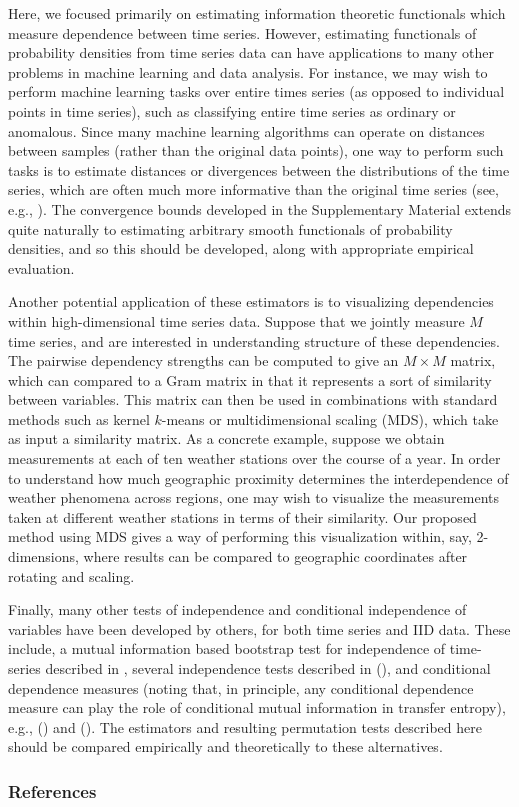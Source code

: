 \documentclass{article} %
\begin{document}
Here, we focused primarily on estimating information theoretic functionals
which measure dependence between time series. However, estimating functionals
of probability densities from time series data can have applications to many
other problems in machine learning and data analysis. For instance, we may wish
to perform machine learning tasks over entire times series (as opposed to
individual points in time series), such as classifying entire time series as
ordinary or anomalous. Since many machine learning algorithms can operate on
distances between samples (rather than the original data points), one way to
perform such tasks is to estimate distances or divergences between the
distributions of the time series, which are often much more informative than
the original time series (see, e.g., \cite{poczos12learningOnDists}). The
convergence bounds developed in the Supplementary Material extends quite
naturally to estimating arbitrary smooth functionals of probability densities,
and so this should be developed, along with appropriate empirical evaluation.

Another potential application of these estimators is to visualizing
dependencies within high-dimensional time series data. Suppose that we jointly
measure $M$ time series, and are interested in understanding structure of these
dependencies. The pairwise dependency strengths can be computed to give an
$M \times M$ matrix, which can compared to a Gram matrix in that it represents
a sort of similarity between variables. This matrix can then be used in
combinations with standard methods such as kernel $k$-means or multidimensional
scaling (MDS), which take as input a similarity matrix.
As a concrete example, suppose we obtain measurements at each of ten weather
stations over the course of a year. In order to understand how much geographic
proximity determines the interdependence of weather phenomena across regions,
one may wish to visualize the measurements taken at different weather stations
in terms of their similarity. Our proposed method using MDS gives a way of
performing this visualization within, say, 2-dimensions, where results can be
compared to geographic coordinates after rotating and scaling.

Finally, many other tests of independence and conditional independence of
variables have been developed by others, for both time series and IID data.
These include, a mutual information based bootstrap test for independence of
time-series described in \cite{wu09bootstrapMI}, several independence tests
described in (\cite{gretton10nonparametricIndependence}), and conditional
dependence measures (noting that, in principle, any conditional dependence
measure can play the role of conditional mutual information in transfer
entropy), e.g., (\cite{bergsma10nonparametric}) and (\cite{zhang12kernel}). The
estimators and resulting permutation tests described here should be compared
empirically and theoretically to these alternatives.

\newpage
\subsubsection*{References}
{


}
\end{document}
